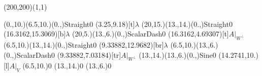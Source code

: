 \unitlength=1bp%

\begin{feynartspicture}(200,200)(1,1)

\FADiagram{}
\FAProp(0.,10.)(6.5,10.)(0.,){Straight}{0}
\FALabel(3.25,9.18)[t]{$\lambda$}
\FAProp(20,15.)(13.,14.)(0.,){Straight}{0}
\FALabel(16.3162,15.3069)[b]{$\lambda$}
\FAProp(20,5.)(13.,6.)(0.,){ScalarDash}{0}
\FALabel(16.3162,4.69307)[t]{$A|_{W^\perp}$}
\FAProp(6.5,10.)(13.,14.)(0.,){Straight}{0}
\FALabel(9.33882,12.9682)[br]{$\lambda$}
\FAProp(6.5,10.)(13.,6.)(0.,){ScalarDash}{0}
\FALabel(9.33882,7.03184)[tr]{$A|_{W^\perp}$}
\FAProp(13.,14.)(13.,6.)(0.,){Sine}{0}
\FALabel(14.2741,10.)[l]{$A|_V$}
\FAVert(6.5,10.){0}
\FAVert(13.,14.){0}
\FAVert(13.,6.){0}
\end{feynartspicture}

